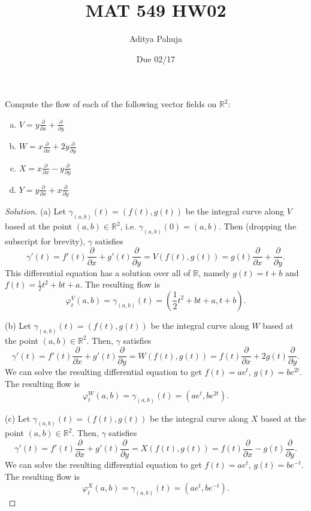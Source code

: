 \documentclass[10pt]{article}
\title{MAT 549 HW02}
\author{\large Aditya Pahuja}
\date{\large Due 02/17}
\providecommand{\half}{\frac{1}{2}}
\providecommand{\RR}{\mathbb R}
\providecommand{\ii}{\item}
\newenvironment{soln}{\begin{proof}[Solution]}{\end{proof}}
\providecommand{\tanvec}[1]{\frac{\partial}{\partial #1}}
\begin{document}
\maketitle

\begin{problem}
    Compute the flow of each of the following vector fields on $\RR^2$:
    \begin{enumerate}[(a)]
        \ii $V = y\tanvec x + \tanvec y$
	\ii $W = x\tanvec x + 2y\tanvec y$
	\ii $X = x\tanvec x - y\tanvec y$
	\ii $Y = y\tanvec x + x\tanvec y$
    \end{enumerate}
\end{problem}

\begin{soln}
    (a) Let $\gamma_{(a,b)}(t) = (f(t),g(t))$ be the integral curve
    along $V$ based at the point $(a,b)\in\RR^2$,
    i.e. $\gamma_{(a,b)}(0) = (a,b)$.
    Then (dropping the subscript for brevity), $\gamma$ satisfies
    \[
	\gamma'(t) = f'(t)\tanvec x + g'(t)\tanvec y = V(f(t),g(t))
	= g(t)\tanvec x + \tanvec y.
    \]
    This differential equation has a solution over all of $\RR$, namely
    $g(t) = t + b$ and $f(t) = \half t^2 + bt + a$.
    The resulting flow is
    \begin{equation*}
	\varphi_t^V(a,b) = \gamma_{(a,b)}(t) = \left(\half t^2+bt+a,t+b\right).
    \end{equation*}

    (b) Let $\gamma_{(a,b)}(t) = (f(t),g(t))$ be the integral curve
    along $W$ based at the point $(a,b)\in\RR^2$.
    Then, $\gamma$ satisfies
    \[
	\gamma'(t) = f'(t)\tanvec x + g'(t)\tanvec y = W(f(t),g(t))
	= f(t)\tanvec x + 2g(t)\tanvec y.
    \]
    We can solve the resulting differential equation to get
    $f(t) = ae^t$, $g(t) = be^{2t}$.
    The resulting flow is
    \begin{equation*}
	\varphi_t^W(a,b) = \gamma_{(a,b)}(t) = (ae^t,be^{2t}).
    \end{equation*}

    (c) Let $\gamma_{(a,b)}(t) = (f(t),g(t))$ be the integral curve
    along $X$ based at the point $(a,b)\in\RR^2$.
    Then, $\gamma$ satisfies
    \[
	\gamma'(t) = f'(t)\tanvec x + g'(t)\tanvec y = X(f(t),g(t))
	= f(t)\tanvec x - g(t)\tanvec y.
    \]
    We can solve the resulting differential equation to get
    $f(t) = ae^t$, $g(t) = be^{-t}$.
    The resulting flow is
    \begin{equation*}
	\varphi_t^X(a,b) = \gamma_{(a,b)}(t) = (ae^t,be^{-t}).
    \end{equation*}


\end{soln}
\end{document}
